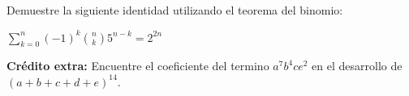 \documentclass[12pt]{article}
\begin{document}
\begin{problema}
    Demuestre la siguiente identidad utilizando el teorema del binomio:

    \begin{center}
        $\sum_{k=0}^{n} (-1)^k \binom{n}{k} 5^{n-k} = 2^{2n}$
    \end{center}
\end{problema}

\textbf{Crédito extra:} Encuentre el coeficiente del termino  $a^7 b^4 c e^2$ en el desarrollo de $(a+b+c+d+e)^{14}$.
\end{document}
